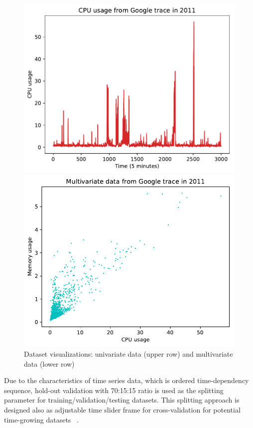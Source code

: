 \documentclass[11pt,twoside]{article}
\begin{document}
\begin{multicols}{2}
\begin{figure}[!ht]
  \begin{minipage}[b]{0.48\linewidth}
    \centering
    \includegraphics[width=0.9\linewidth]{data/google_cpu_5m.pdf} 
  \end{minipage}%
  \begin{minipage}[b]{0.48\linewidth}
    \centering
    \includegraphics[width=0.89\linewidth]{data/cpu_ram.pdf} 
  \end{minipage} 
  
  \caption{Dataset visualizations: univariate data (upper row) and multivariate data (lower row)} 
  \label{dataset_visual} 
\end{figure}

Due to the characteristics of time series data, which is ordered time-dependency sequence, hold-out validation with 70:15:15 ratio is used as the splitting parameter for training/validation/testing datasets. This splitting approach is designed also as adjustable time slider frame for cross-validation for potential time-growing datasets~ \citep{bishop2006pattern, arlot2010survey}.


\end{multicols}
\end{document}
